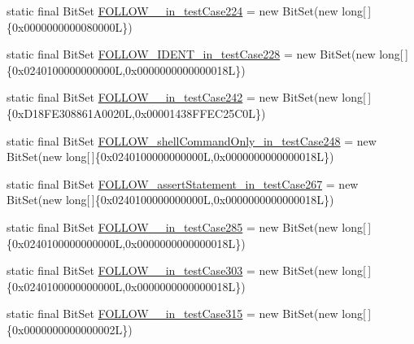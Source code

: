 \begin{DoxyCompactItemize}
static final Bit\-Set \hyperlink{classorg_1_1tzi_1_1use_1_1parser_1_1testsuite_1_1_test_suite_parser_a2b38436a4191e114ac435964642e0396}{F\-O\-L\-L\-O\-W\-\_\-\_\-in\-\_\-test\-Case224} = new Bit\-Set(new long\mbox{[}$\,$\mbox{]}\{0x0000000000080000\-L\})
\item 
static final Bit\-Set \hyperlink{classorg_1_1tzi_1_1use_1_1parser_1_1testsuite_1_1_test_suite_parser_a0c69d771d4118564b3fb41fa144948df}{F\-O\-L\-L\-O\-W\-\_\-\-I\-D\-E\-N\-T\-\_\-in\-\_\-test\-Case228} = new Bit\-Set(new long\mbox{[}$\,$\mbox{]}\{0x0240100000000000\-L,0x0000000000000018\-L\})
\item 
static final Bit\-Set \hyperlink{classorg_1_1tzi_1_1use_1_1parser_1_1testsuite_1_1_test_suite_parser_a5bd85abea3661641235241173c955059}{F\-O\-L\-L\-O\-W\-\_\-\_\-in\-\_\-test\-Case242} = new Bit\-Set(new long\mbox{[}$\,$\mbox{]}\{0x\-D18\-F\-E308861\-A0020\-L,0x00001438\-F\-F\-E\-C25\-C0\-L\})
\item 
static final Bit\-Set \hyperlink{classorg_1_1tzi_1_1use_1_1parser_1_1testsuite_1_1_test_suite_parser_a0f75bc7080e34b9aae8ab898bf836c85}{F\-O\-L\-L\-O\-W\-\_\-shell\-Command\-Only\-\_\-in\-\_\-test\-Case248} = new Bit\-Set(new long\mbox{[}$\,$\mbox{]}\{0x0240100000000000\-L,0x0000000000000018\-L\})
\item 
static final Bit\-Set \hyperlink{classorg_1_1tzi_1_1use_1_1parser_1_1testsuite_1_1_test_suite_parser_a958955128ce78c7d138f356d2b71dc7b}{F\-O\-L\-L\-O\-W\-\_\-assert\-Statement\-\_\-in\-\_\-test\-Case267} = new Bit\-Set(new long\mbox{[}$\,$\mbox{]}\{0x0240100000000000\-L,0x0000000000000018\-L\})
\item 
static final Bit\-Set \hyperlink{classorg_1_1tzi_1_1use_1_1parser_1_1testsuite_1_1_test_suite_parser_acd314621ed0f38e0939d3f2d93c30261}{F\-O\-L\-L\-O\-W\-\_\-\_\-in\-\_\-test\-Case285} = new Bit\-Set(new long\mbox{[}$\,$\mbox{]}\{0x0240100000000000\-L,0x0000000000000018\-L\})
\item 
static final Bit\-Set \hyperlink{classorg_1_1tzi_1_1use_1_1parser_1_1testsuite_1_1_test_suite_parser_a5eeda6139b4e46597bef0efa51adaade}{F\-O\-L\-L\-O\-W\-\_\-\_\-in\-\_\-test\-Case303} = new Bit\-Set(new long\mbox{[}$\,$\mbox{]}\{0x0240100000000000\-L,0x0000000000000018\-L\})
\item 
static final Bit\-Set \hyperlink{classorg_1_1tzi_1_1use_1_1parser_1_1testsuite_1_1_test_suite_parser_a89659d3ccadc5f5bfbac823894a85b4d}{F\-O\-L\-L\-O\-W\-\_\-\_\-in\-\_\-test\-Case315} = new Bit\-Set(new long\mbox{[}$\,$\mbox{]}\{0x0000000000000002\-L\})
\item 

\end{DoxyCompactItemize}
